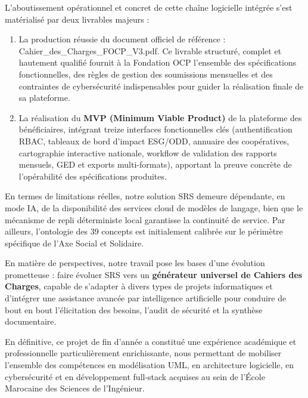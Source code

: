 L'aboutissement opérationnel et concret de cette chaîne logicielle intégrée s'est matérialisé par deux livrables majeurs :
\begin{enumerate}
    \item La production réussie du document officiel de référence : {\ttfamily Cahier\allowbreak\_\allowbreak des\allowbreak\_\allowbreak Charges\allowbreak\_\allowbreak FOCP\allowbreak\_\allowbreak V3.pdf}. Ce livrable structuré, complet et hautement qualifié fournit à la Fondation OCP l'ensemble des spécifications fonctionnelles, des règles de gestion des soumissions mensuelles et des contraintes de cybersécurité indispensables pour guider la réalisation finale de sa plateforme.
    \item La réalisation du \textbf{MVP (Minimum Viable Product)} de la plateforme des bénéficiaires, intégrant treize interfaces fonctionnelles clés (authentification RBAC, tableaux de bord d'impact ESG/ODD, annuaire des coopératives, cartographie interactive nationale, workflow de validation des rapports mensuels, GED et exports multi-formats), apportant la preuve concrète de l'opérabilité des spécifications produites.
\end{enumerate}

En termes de limitations réelles, notre solution SRS demeure dépendante, en mode IA, de la disponibilité des services cloud de modèles de langage, bien que le mécanisme de repli déterministe local garantisse la continuité de service. Par ailleurs, l'ontologie des 39 concepts est initialement calibrée sur le périmètre spécifique de l'Axe Social et Solidaire.

En matière de perspectives, notre travail pose les bases d'une évolution prometteuse : faire évoluer SRS vers un \textbf{générateur universel de Cahiers des Charges}, capable de s'adapter à divers types de projets informatiques et d'intégrer une assistance avancée par intelligence artificielle pour conduire de bout en bout l'élicitation des besoins, l'audit de sécurité et la synthèse documentaire.

En définitive, ce projet de fin d'année a constitué une expérience académique et professionnelle particulièrement enrichissante, nous permettant de mobiliser l'ensemble des compétences en modélisation UML, en architecture logicielle, en cybersécurité et en développement full-stack acquises au sein de l'École Marocaine des Sciences de l'Ingénieur.

\newpage
